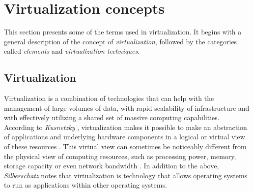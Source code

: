	\section {Virtualization concepts}\label{sec:concetposVirtualizacion}	
	
	This section presents some of the terms used in virtualization. 
	It begins with a general description of the concept of \textit{virtualization}, followed by the categories called \textit{elements} and \textit{virtualization techniques}.
	
	\subsection{Virtualization}
	
	Virtualization is a combination of technologies that can help with the management of large volumes of data, with rapid scalability of infrastructure and with effectively utilizing a shared set of massive computing capabilities. According to \textit{Kusnetzky} \cite{Kusnetzky2011}, virtualization makes it possible to make an abstraction of applications and underlying hardware components in a logical or virtual view of these resources \cite{AbdElRahem2016}. This virtual view can sometimes be noticeably different from the physical view of computing resources, such as processing power, memory, storage capacity or even network bandwidth \cite{Stallings2015}. In addition to the above, \textit{Silberschatz} \cite{Silberschatz2014} notes that virtualization is technology that allows operating systems to run as applications within other operating systems.
	
	
	
	
